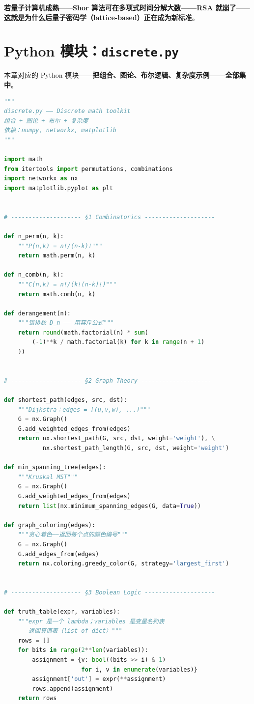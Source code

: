\textbf{若量子计算机成熟}——\textbf{Shor 算法可在多项式时间分解大数——\textbf{RSA 就崩了}}——\textbf{这就是为什么\textbf{后量子密码学}（lattice-based）正在成为新标准}。

\section{Python 模块：\texttt{discrete.py}}

本章对应的 Python 模块——\textbf{把组合、图论、布尔逻辑、复杂度示例——全部集中}。

\begin{lstlisting}[language=Python, caption={discrete.py 核心 API}]
"""
discrete.py —— Discrete math toolkit
组合 + 图论 + 布尔 + 复杂度
依赖：numpy, networkx, matplotlib
"""

import math
from itertools import permutations, combinations
import networkx as nx
import matplotlib.pyplot as plt


# -------------------- §1 Combinatorics --------------------

def n_perm(n, k):
    """P(n,k) = n!/(n-k)!"""
    return math.perm(n, k)

def n_comb(n, k):
    """C(n,k) = n!/(k!(n-k)!)"""
    return math.comb(n, k)

def derangement(n):
    """错排数 D_n —— 用容斥公式"""
    return round(math.factorial(n) * sum(
        (-1)**k / math.factorial(k) for k in range(n + 1)
    ))


# -------------------- §2 Graph Theory --------------------

def shortest_path(edges, src, dst):
    """Dijkstra：edges = [(u,v,w), ...]"""
    G = nx.Graph()
    G.add_weighted_edges_from(edges)
    return nx.shortest_path(G, src, dst, weight='weight'), \
           nx.shortest_path_length(G, src, dst, weight='weight')

def min_spanning_tree(edges):
    """Kruskal MST"""
    G = nx.Graph()
    G.add_weighted_edges_from(edges)
    return list(nx.minimum_spanning_edges(G, data=True))

def graph_coloring(edges):
    """贪心着色——返回每个点的颜色编号"""
    G = nx.Graph()
    G.add_edges_from(edges)
    return nx.coloring.greedy_color(G, strategy='largest_first')


# -------------------- §3 Boolean Logic --------------------

def truth_table(expr, variables):
    """expr 是一个 lambda；variables 是变量名列表
       返回真值表（list of dict）"""
    rows = []
    for bits in range(2**len(variables)):
        assignment = {v: bool((bits >> i) & 1)
                      for i, v in enumerate(variables)}
        assignment['out'] = expr(**assignment)
        rows.append(assignment)
    return rows



\end{lstlisting}
